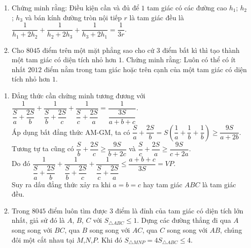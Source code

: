 \begin{ex}%
    \hfill
    \begin{enumerate}
    	\item Chứng minh rằng: Điều kiện cần và đủ để $1$ tam giác có các đường cao $h_1$; $h_2$; $h_3$ và bán kính đường tròn nội tiếp $r$ là tam giác đều là $\dfrac{1}{h_1+2h_2}+\dfrac{1}{h_2+2h_3}+\dfrac{1}{h_3+2h_1}=\dfrac{1}{3r}$.
    	\item Cho $8045$ điểm trên một mặt phẳng sao cho cứ $3$ điểm bất kì thì tạo thành một tam giác có diện tích nhỏ hơn $1$. Chứng minh rằng: Luôn có thể có ít nhất $2012$ điểm nằm trong tam giác hoặc trên cạnh của một tam giác có diện tích nhỏ hơn $1$.
    \end{enumerate}
\loigiai
    { \begin{enumerate}
    		\item Đẳng thức cần chứng minh tương đương với $\dfrac{1}{\dfrac{S}{a}+\dfrac{2S}{b}}+\dfrac{1}{\dfrac{S}{b}+\dfrac{2S}{c}}+\dfrac{1}{\dfrac{S}{c}+\dfrac{2S}{a}}=\dfrac{1}{\dfrac{3S}{{a+b+c}}}$.\\
    		Áp dụng bất đẳng thức AM-GM, ta có $\dfrac{S}{a}+\dfrac{2S}{b}=S\left({\dfrac{1}{a}+\dfrac{1}{b}+\dfrac{1}{b}}\right)\geqslant \dfrac{9S}{a+2b}$.\\
    		Tương tự ta cũng có $\dfrac{S}{b}+\dfrac{2S}{c}\geqslant \dfrac{9S}{b+2c}$ và $\dfrac{S}{c}+\dfrac{2S}{a}\geqslant \dfrac{9S}{c+2a}$.\\
    		Do đó $\dfrac{1}{\dfrac{S}{a}+\dfrac{2S}{b}}+\dfrac{1}{\dfrac{S}{b}+\dfrac{2S}{c}}+\dfrac{1}{\dfrac{S}{c}+\dfrac{2S}{a}}\leqslant \dfrac{a+b+c}{3S}=VP$.\\
    		Suy ra dấu đẳng thức xảy ra khi $a=b=c$ hay tam giác $ABC$ là tam giác đều.
    		\item Trong $8045$ điểm luôn tìm được $3$ điểm là đỉnh của tam giác có diện tích lớn nhất, giả sử đó là $A$, $B$, $C$ với $S_{\triangle ABC}\leqslant 1$. Dựng các đường thẳng đi qua $A$ song song với $BC$, qua $B$ song song với $AC$, qua $C$ song song với $AB$, chúng đôi một cắt nhau tại $M$,$N$,$P$. Khi đó $S_{\triangle MNP}=4S_{\triangle ABC}\leqslant 4$.\\
\end{enumerate}}
\end{ex}
